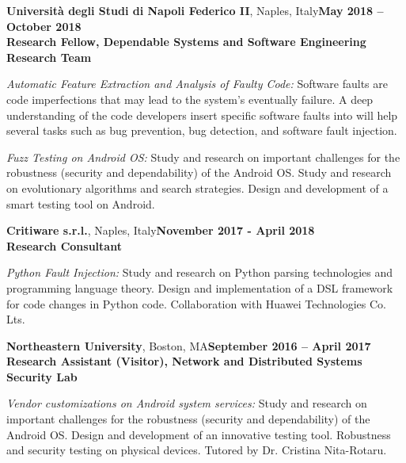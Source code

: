 \documentclass[margin,line]{resume}
\begin{document}
\begin{resume}
\textbf{Universit\`a degli Studi di Napoli Federico II}, Naples, Italy\hfill\textbf{May 2018 -- October 2018}\\
\textbf{Research Fellow, Dependable Systems and Software Engineering Research Team}\hfill 
\vspace{-3mm}\\\vspace{-1mm}
\begin{list2}
	\item \filbreak\textit{Automatic Feature Extraction and Analysis of Faulty Code:} Software faults are code imperfections that may lead to the system's eventually failure. A deep understanding of the code developers insert specific software faults into will help several tasks such as bug prevention, bug detection, and software fault injection.
    \item \filbreak\textit{Fuzz Testing on Android OS:} Study and research on important challenges for the robustness (security and dependability) of the Android OS. Study and research on evolutionary algorithms and search strategies. Design and development of a smart testing tool on Android.
\end{list2}

\textbf{Critiware s.r.l.}, Naples, Italy\hfill\textbf{November 2017 - April 2018}\\
\textbf{Research Consultant}\hfill 
\vspace{-3mm}\\\vspace{-1mm}
\begin{list2}
	\item \filbreak\textit{Python Fault Injection:} Study and research on Python parsing technologies and programming language theory. Design and implementation of a DSL framework for code changes in Python code. Collaboration with Huawei Technologies Co. Lts.
\end{list2}

\textbf{Northeastern University}, Boston, MA\hfill\textbf{September 2016 -- April 2017}\\
\textbf{Research Assistant (Visitor), Network and Distributed Systems Security Lab}\hfill 
\vspace{-3mm}\\\vspace{-1mm}
\begin{list2}
	\item \filbreak\textit{Vendor customizations on Android system services:} Study and research on important challenges for the robustness (security and dependability) of the Android OS. Design and development of an innovative testing tool. Robustness and security testing on physical devices. Tutored by Dr. Cristina Nita-Rotaru.
\end{list2}


\end{resume}
\end{document}
